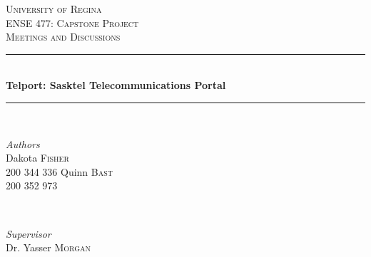 \documentclass[12pt]{article}
\begin{document}

\begin{titlepage} %
	\newcommand{\HRule}{\rule{\linewidth}{0.5mm}} %
	
	\center %
	
	
	\textsc{\LARGE University of Regina}\\[1.5cm] %
	
	\textsc{\Large ENSE 477: Capstone Project}\\[0.5cm] %
	
	\textsc{\large Meetings and Discussions}\\[0.5cm] %
	
	
	\HRule\\[0.4cm]
	
	{\huge\bfseries Telport: Sasktel Telecommunications Portal}\\[0.4cm] %
	
	\HRule\\[1.5cm]
	
	
	\begin{minipage}[t]{0.4\textwidth}
		\begin{flushleft}
			\large
			\textit{Authors}\\
			Dakota \textsc{Fisher}\\ %
			200 344 336\newline \newline
			Quinn \textsc{Bast}\\ %
			200 352 973
		\end{flushleft}
	\end{minipage}
	~
	\begin{minipage}[t]{0.4\textwidth}
		\begin{flushright}
			\large
			\textit{Supervisor}\\
			Dr. Yasser \textsc{Morgan} %
		\end{flushright}
	\end{minipage}
	

\end{titlepage}
\end{document}
